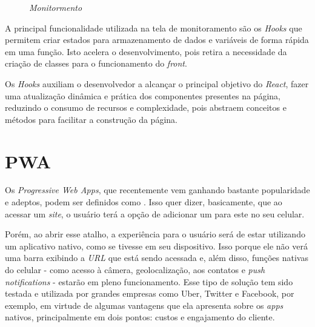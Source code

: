 \begin{figure}[H]
    \centering
    \caption{\textit{Monitormento}}
    \label{fig:monitoramento}
\end{figure}

A principal funcionalidade utilizada na tela de monitoramento são os \textit{Hooks} que permitem criar estados para armazenamento de dados e variáveis de forma rápida em uma função. Isto acelera o desenvolvimento, pois retira a necessidade da criação de classes para o funcionamento do \textit{front}.

Os \textit{Hooks} auxiliam o desenvolvedor a alcançar o principal objetivo do \textit{React}, fazer uma atualização dinâmica e prática dos componentes presentes na página, reduzindo o consumo de recursos e complexidade, pois abstraem conceitos e métodos para facilitar a construção da página.

\section{PWA}
\label{sec:pwa}

Os \textit{Progressive Web Apps}, que recentemente vem ganhando bastante popularidade e adeptos, podem ser definidos como \cite{Souza19} . Isso quer dizer, basicamente, que ao acessar um \textit{site}, o usuário terá a opção de adicionar um  para este no seu celular.

Porém, ao abrir esse atalho, a experiência para o usuário será de estar utilizando um aplicativo nativo, como se tivesse  em seu dispositivo. Isso porque ele não verá uma barra exibindo a \textit{URL} que está sendo acessada e, além disso, funções nativas do celular - como acesso à câmera, geolocalização, aos contatos e \textit{push notifications} - estarão em pleno funcionamento. Esse tipo de solução tem sido testada e utilizada por grandes empresas como Uber, Twitter e Facebook, por exemplo, em virtude de algumas vantagens que ela apresenta sobre os \textit{apps} nativos, principalmente em dois pontos: custos e engajamento do cliente.


